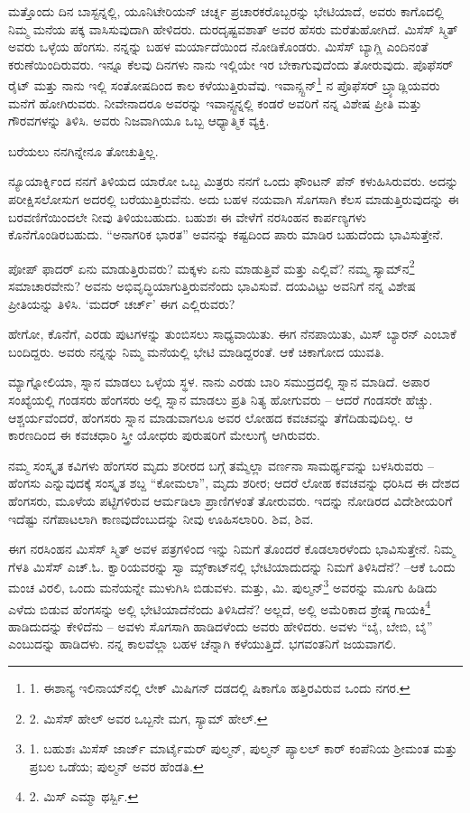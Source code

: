 ಮತ್ತೊಂದು ದಿನ ಬಾಸ್ಟನ್ನಲ್ಲಿ, ಯೂನಿಟೇರಿಯನ್ ಚರ್ಚ್ನ ಪ್ರಚಾರಕರೊಬ್ಬರನ್ನು ಭೇಟಿಯಾದೆ, ಅವರು ಕಾಗೊದಲ್ಲಿ ನಿಮ್ಮ ಮನೆಯ ಪಕ್ಕ ವಾಸಿಸುವುದಾಗಿ ಹೇಳಿದರು. ದುರದೃಷ್ಟವಶಾತ್ ಅವರ ಹೆಸರು ಮರೆತುಹೋಗಿದೆ. ಮಿಸೆಸ್ ಸ್ಮಿತ್ ಅವರು ಒಳ್ಳೆಯ ಹೆಂಗಸು. ನನ್ನನ್ನು ಬಹಳ ಮರ್ಯಾದೆಯಿಂದ ನೋಡಿಕೊಂಡರು. ಮಿಸೆಸ್ ಬ್ಯಾಗ್ಲಿ ಎಂದಿನಂತೆ ಕರುಣೆಯಿಂದಿರುವರು. ಇನ್ನೂ ಕೆಲವು ದಿನಗಳು ನಾನು ಇಲ್ಲಿಯೇ ಇರ ಬೇಕಾಗುವುದೆಂದು ತೋರುವುದು. ಪೊಫೆಸರ್ ರೈಟ್ ಮತ್ತು ನಾನು ಇಲ್ಲಿ ಸಂತೋಷದಿಂದ ಕಾಲ ಕಳೆಯುತ್ತಿರುವೆವು. ಇವಾನ್ಸ್ಟನ್\footnote{1. ಈಶಾನ್ಯ ಇಲಿನಾಯ್​ನಲ್ಲಿ ಲೇಕ್ ಮಿಷಿಗನ್ ದಡದಲ್ಲಿ ಷಿಕಾಗೊ ಹತ್ತಿರವಿರುವ ಒಂದು ನಗರ.} ನ ಪ್ರೊಫೆಸರ್ ಬ್ರ್ಯಾಡ್ಲಿಯವರು ಮನೆಗೆ ಹೋಗಿರುವರು. ನೀವೇನಾದರೂ ಅವರನ್ನು ಇವಾನ್ಸ್ಟನ್ನಲ್ಲಿ ಕಂಡರೆ ಅವರಿಗೆ ನನ್ನ ವಿಶೇಷ ಪ್ರೀತಿ ಮತ್ತು ಗೌರವಗಳನ್ನು ತಿಳಿಸಿ. ಅವರು ನಿಜವಾಗಿಯೂ ಒಬ್ಬ ಆಧ್ಯಾತ್ಮಿಕ ವ್ಯಕ್ತಿ.

ಬರೆಯಲು ನನಗಿನ್ನೇನೂ ತೋಚುತ್ತಿಲ್ಲ.

ನ್ಯೂಯಾರ್ಕ್ನಿಂದ ನನಗೆ ತಿಳಿಯದ ಯಾರೋ ಒಬ್ಬ ಮಿತ್ರರು ನನಗೆ ಒಂದು ಫೌಂಟನ್ ಪೆನ್ ಕಳುಹಿಸಿರುವರು. ಅದನ್ನು ಪರೀಕ್ಷಿಸಲೋಸುಗ ಅದರಲ್ಲಿ ಬರೆಯುತ್ತಿರುವೆನು. ಅದು ಬಹಳ ನಯವಾಗಿ ಸೊಗಸಾಗಿ ಕೆಲಸ ಮಾಡುತ್ತಿರುವುದನ್ನು ಈ ಬರವಣಿಗೆಯಿಂದಲೇ ನೀವು ತಿಳಿಯಬಹುದು. ಬಹುಶಃ ಈ ವೇಳೆಗೆ ನರಸಿಂಹನ ಕಾರ್ಪಣ್ಯಗಳು ಕೊನೆಗೊಂಡಿರಬಹುದು. “ಅನಾಗರಿಕ ಭಾರತ” ಅವನನ್ನು ಕಷ್ಟದಿಂದ ಪಾರು ಮಾಡಿರ ಬಹುದೆಂದು ಭಾವಿಸುತ್ತೇನೆ.

ಪೋಪ್ ಫಾದರ್ ಏನು ಮಾಡುತ್ತಿರುವರು? ಮಕ್ಕಳು ಏನು ಮಾಡುತ್ತಿವೆ ಮತ್ತು ಎಲ್ಲಿವೆ? ನಮ್ಮ ಸ್ಯಾಮ್​ನ\footnote{2. ಮಿಸೆಸ್ ಹೇಲ್ ಅವರ ಒಬ್ಬನೇ ಮಗ, ಸ್ಯಾಮ್​ ಹೇಲ್.} ಸಮಾಚಾರವೇನು? ಅವನು ಅಭಿವೃದ್ಧಿಯಾಗುತ್ತಿರುವನೆಂದು ಭಾವಿಸುವೆ. ದಯವಿಟ್ಟು ಅವನಿಗೆ ನನ್ನ ವಿಶೇಷ ಪ್ರೀತಿಯನ್ನು ತಿಳಿಸಿ. ‘ಮದರ್ ಚರ್ಚ್’ ಈಗ ಎಲ್ಲಿರುವರು?

ಹೇಗೋ, ಕೊನೆಗೆ, ಎರಡು ಪುಟಗಳನ್ನು ತುಂಬಿಸಲು ಸಾಧ್ಯವಾಯಿತು. ಈಗ ನೆನಪಾಯಿತು, ಮಿಸ್ ಬ್ಯಾರನ್ ಎಂಬಾಕೆ ಬಂದಿದ್ದರು. ಅವರು ನನ್ನನ್ನು ನಿಮ್ಮ ಮನೆಯಲ್ಲಿ ಭೇಟಿ ಮಾಡಿದ್ದರಂತೆ. ಆಕೆ ಚಿಕಾಗೋದ ಯುವತಿ.

ಮ್ಯಾಗ್ನೋಲಿಯಾ, ಸ್ನಾನ ಮಾಡಲು ಒಳ್ಳೆಯ ಸ್ಥಳ. ನಾನು ಎರಡು ಬಾರಿ ಸಮುದ್ರದಲ್ಲಿ ಸ್ನಾನ ಮಾಡಿದೆ. ಅಪಾರ ಸಂಖ್ಯೆಯಲ್ಲಿ ಗಂಡಸರು ಹೆಂಗಸರು ಅಲ್ಲಿ ಸ್ನಾನ ಮಾಡಲು ಪ್ರತಿ ನಿತ್ಯ ಹೋಗುವರು – ಆದರೆ ಗಂಡಸರೇ ಹೆಚ್ಚು. ಆಶ್ಚರ್ಯವೆಂದರೆ, ಹೆಂಗಸರು ಸ್ನಾನ ಮಾಡುವಾಗಲೂ ಅವರ ಲೋಹದ ಕವಚವನ್ನು ತೆಗೆದಿಡುವುದಿಲ್ಲ. ಆ ಕಾರಣದಿಂದ ಈ ಕವಚಧಾರಿ ಸ್ತ್ರೀ ಯೋಧರು ಪುರುಷರಿಗೆ ಮೇಲುಗೈ ಆಗಿರುವರು.

ನಮ್ಮ ಸಂಸ್ಕೃತ ಕವಿಗಳು ಹೆಂಗಸರ ಮೃದು ಶರೀರದ ಬಗ್ಗೆ ತಮ್ಮೆಲ್ಲಾ ವರ್ಣನಾ ಸಾಮರ್ಥ್ಯವನ್ನು ಬಳಸಿರುವರು – ಹೆಂಗಸು ಎನ್ನುವುದಕ್ಕೆ ಸಂಸ್ಕೃತ ಶಬ್ದ “ಕೋಮಲಾ”, ಮೃದು ಶರೀರ; ಆದರೆ ಲೋಹ ಕವಚವನ್ನು ಧರಿಸಿದ ಈ ದೇಶದ ಹೆಂಗಸರು, ಮೂಳೆಯ ಪಟ್ಟಿಗಳಿರುವ ಆರ್ಮಡಿಲಾ ಪ್ರಾಣಿಗಳಂತೆ ತೋರುವರು. ಇದನ್ನು ನೋಡಿರದ ವಿದೇಶೀಯರಿಗೆ ಇದೆಷ್ಟು ನಗೆಪಾಟಲಾಗಿ ಕಾಣವುದೆಂಬುದನ್ನು ನೀವು ಊಹಿಸಲಾರಿರಿ. ಶಿವ, ಶಿವ.

ಈಗ ನರಸಿಂಹನ ಮಿಸೆಸ್ ಸ್ಮಿತ್ ಅವಳ ಪತ್ರಗಳಿಂದ ಇನ್ನು ನಿಮಗೆ ತೊಂದರೆ ಕೊಡಲಾರಳೆಂದು ಭಾವಿಸುತ್ತೇನೆ. ನಿಮ್ಮ ಗೆಳತಿ ಮಿಸೆಸ್ ಎಚ್.ಓ. ಕ್ವಾರಿಯವರನ್ನು ಸ್ವಾ ಮ್ಸ್​ಕಾಟ್​ನಲ್ಲಿ ಭೇಟಿಯಾದುದನ್ನು ನಿಮಗೆ ತಿಳಿಸಿದೆನೆ? –ಆಕೆ ಒಂದು ಮಂಚ ವಿರಲಿ, ಒಂದು ಮನೆಯನ್ನೇ ಮುಳುಗಿಸಿ ಬಿಡುವಳು. ಮತ್ತು, ಮಿ. ಪುಲ್ಮನ್\footnote{1. ಬಹುಶಃ ಮಿಸೆಸ್ ಜಾರ್ಜ್ ಮಾರ್ಟೈಮರ್ ಪುಲ್ಮನ್, ಪುಲ್ಮನ್ ಪ್ಯಾಲಲ್ ಕಾರ್ ಕಂಪೆನಿಯ ಶ‍್ರೀಮಂತ ಮತ್ತು ಪ್ರಬಲ ಒಡೆಯ; ಪುಲ್ಮನ್ ಅವರ ಹೆಂಡತಿ.} ಅವರನ್ನು ಮೂಗು ಹಿಡಿದು ಎಳೆದು ಬಿಡುವ ಹೆಂಗಸನ್ನು ಅಲ್ಲಿ ಭೇಟಿಯಾದೆನೆಂದು ತಿಳಿಸಿದೆನೆ? ಅಲ್ಲದೆ, ಅಲ್ಲಿ ಅಮೆರಿಕಾದ ಶ್ರೇಷ್ಠ ಗಾಯಕಿ\footnote{2. ಮಿಸ್ ಎಮ್ಮಾ ಥರ್ಸ್ಬಿ.} ಹಾಡಿದುದನ್ನು ಕೇಳಿದೆನು – ಅವಳು ಸೊಗಸಾಗಿ ಹಾಡಿದಳೆಂದು ಅವರು ಹೇಳಿದರು. ಅವಳು “ಬೈ, ಬೇಬಿ, ಬೈ” ಎಂಬುದನ್ನು ಹಾಡಿದಳು. ನನ್ನ ಕಾಲವೆಲ್ಲಾ ಬಹಳ ಚೆನ್ನಾಗಿ ಕಳೆಯುತ್ತಿದೆ. ಭಗವಂತನಿಗೆ ಜಯವಾಗಲಿ.

